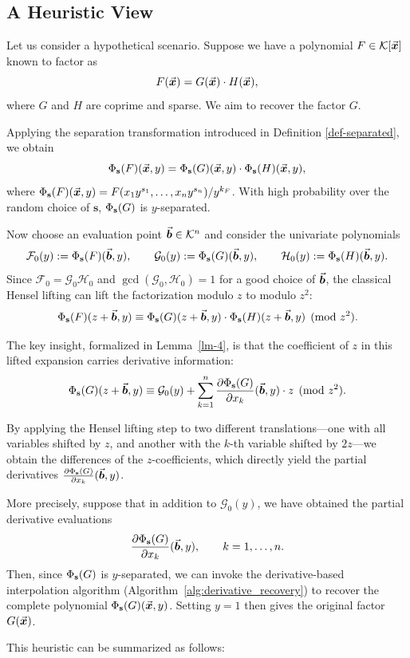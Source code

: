 \documentclass{article}
\numberwithin{equation}{section}
\begin{document}
\subsection{A Heuristic View}\label{sec-HenselMoti}

Let us consider a hypothetical scenario. Suppose we have a polynomial $F \in {\mathcal{K}}[\vec{\boldsymbol{x}}]$ known to factor as
\[
F(\vec{\boldsymbol{x}}) = G(\vec{\boldsymbol{x}}) \cdot H(\vec{\boldsymbol{x}}),
\]
where $G$ and $H$ are coprime and sparse. We aim to recover the factor $G$.

Applying the separation transformation introduced in Definition \ref{def-separated}, we obtain
\[
\Phi_{\mathbf{s}}(F)(\vec{\boldsymbol{x}}, y) = \Phi_{\mathbf{s}}(G)(\vec{\boldsymbol{x}}, y) \cdot \Phi_{\mathbf{s}}(H)(\vec{\boldsymbol{x}}, y),
\]
where $\Phi_{\mathbf{s}}(F)(\vec{\boldsymbol{x}}, y) = F(x_1 y^{s_1}, \dots, x_n y^{s_n}) / y^{k_F}$. With high probability over the random choice of $\mathbf{s}$, $\Phi_{\mathbf{s}}(G)$ is $y$-separated.

Now choose an evaluation point $\vec{\boldsymbol{b}} \in {\mathcal{K}}^n$ and consider the univariate polynomials
\[
\mathcal{F}_0(y) := \Phi_{\mathbf{s}}(F)(\vec{\boldsymbol{b}}, y), \qquad \mathcal{G}_0(y) := \Phi_{\mathbf{s}}(G)(\vec{\boldsymbol{b}}, y), \qquad \mathcal{H}_0(y) := \Phi_{\mathbf{s}}(H)(\vec{\boldsymbol{b}}, y).
\]
Since $\mathcal{F}_0 = \mathcal{G}_0 \mathcal{H}_0$ and $\gcd(\mathcal{G}_0, \mathcal{H}_0) = 1$ for a good choice of $\vec{\boldsymbol{b}}$, the classical Hensel lifting can lift the factorization modulo $z$ to modulo $z^2$:
\[
\Phi_{\mathbf{s}}(F)(z+\vec{\boldsymbol{b}}, y) \equiv \Phi_{\mathbf{s}}(G)(z+\vec{\boldsymbol{b}}, y) \cdot \Phi_{\mathbf{s}}(H)(z+\vec{\boldsymbol{b}}, y) \pmod{z^2}.
\]

The key insight, formalized in Lemma~\ref{lm-4}, is that the coefficient of $z$ in this lifted expansion carries derivative information:
\[
\Phi_{\mathbf{s}}(G)(z+\vec{\boldsymbol{b}}, y) \equiv \mathcal{G}_0(y) + \sum_{k=1}^n \frac{\partial \Phi_{\mathbf{s}}(G)}{\partial x_k}(\vec{\boldsymbol{b}}, y) \cdot z \pmod{z^2}.
\]

By applying the Hensel lifting step to two different translations---one with all variables shifted by $z$, and another with the $k$-th variable shifted by $2z$---we obtain the differences of the $z$-coefficients, which directly yield the partial derivatives $\frac{\partial \Phi_{\mathbf{s}}(G)}{\partial x_k}(\vec{\boldsymbol{b}}, y)$.

More precisely, suppose that in addition to $\mathcal{G}_0(y)$, we have obtained the partial derivative evaluations
\[
\frac{\partial \Phi_{\mathbf{s}}(G)}{\partial x_k}(\vec{\boldsymbol{b}}, y), \qquad k = 1, \dots, n.
\]
Then, since $\Phi_{\mathbf{s}}(G)$ is $y$-separated, we can invoke the derivative-based interpolation algorithm (Algorithm~\ref{alg:derivative_recovery}) to recover the complete polynomial $\Phi_{\mathbf{s}}(G)(\vec{\boldsymbol{x}}, y)$. Setting $y = 1$ then gives the original factor $G(\vec{\boldsymbol{x}})$.

This heuristic can be summarized as follows:
\end{document}
